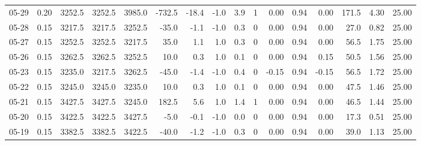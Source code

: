 \begin{threeparttable}
{\begin{tabular}{lrrrrrrrrrrrrrrr}
  05-29 &     0.20 & 3252.5 & 3252.5 & 3985.0 &     -732.5 &          -18.4 &                     -1.0 &                 3.9 &              1 &       0.00 &      0.94 &           0.00 &            171.5 &            4.30 &                  25.00 \\
  05-28 &     0.15 & 3217.5 & 3217.5 & 3252.5 &      -35.0 &           -1.1 &                     -1.0 &                 0.3 &              0 &       0.00 &      0.94 &           0.00 &             27.0 &            0.82 &                  25.00 \\
  05-27 &     0.15 & 3252.5 & 3252.5 & 3217.5 &       35.0 &            1.1 &                      1.0 &                 0.3 &              0 &       0.00 &      0.94 &           0.00 &             56.5 &            1.75 &                  25.00 \\
  05-26 &     0.15 & 3262.5 & 3262.5 & 3252.5 &       10.0 &            0.3 &                      1.0 &                 0.1 &              0 &       0.00 &      0.94 &           0.15 &             50.5 &            1.56 &                  25.00 \\
  05-23 &     0.15 & 3235.0 & 3217.5 & 3262.5 &      -45.0 &           -1.4 &                     -1.0 &                 0.4 &              0 &      -0.15 &      0.94 &          -0.15 &             56.5 &            1.72 &                  25.00 \\
  05-22 &     0.15 & 3245.0 & 3245.0 & 3235.0 &       10.0 &            0.3 &                      1.0 &                 0.1 &              0 &       0.00 &      0.94 &           0.00 &             47.5 &            1.46 &                  25.00 \\
  05-21 &     0.15 & 3427.5 & 3427.5 & 3245.0 &      182.5 &            5.6 &                      1.0 &                 1.4 &              1 &       0.00 &      0.94 &           0.00 &             46.5 &            1.44 &                  25.00 \\
  05-20 &     0.15 & 3422.5 & 3422.5 & 3427.5 &       -5.0 &           -0.1 &                     -1.0 &                 0.0 &              0 &       0.00 &      0.94 &           0.00 &             17.3 &            0.51 &                  25.00 \\
  05-19 &     0.15 & 3382.5 & 3382.5 & 3422.5 &      -40.0 &           -1.2 &                     -1.0 &                 0.3 &              0 &       0.00 &      0.94 &           0.00 &             39.0 &            1.13 &                  25.00 \\

\end{tabular}}
\end{threeparttable}

